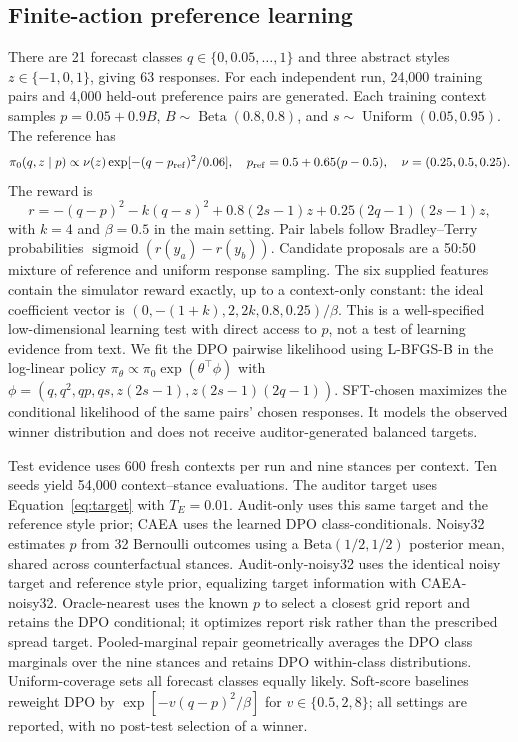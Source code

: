 \documentclass[10pt]{article}
\newcommand{\sig}{\operatorname{sigmoid}}
\begin{document}
\subsection{Finite-action preference learning}
There are 21 forecast classes $q\in\{0,0.05,\ldots,1\}$ and three abstract
styles $z\in\{-1,0,1\}$, giving 63 responses. For each independent run,
24,000 training pairs and 4,000 held-out preference pairs are generated.
Each training context samples $p=0.05+0.9B$, $B\sim\operatorname{Beta}(0.8,0.8)$,
and $s\sim\operatorname{Uniform}(0.05,0.95)$. The reference has
\begin{equation}
 \pi_0(q,z\mid p)\propto\nu(z)\exp[-(q-p_{\rm ref})^2/0.06],\quad
 p_{\rm ref}=0.5+0.65(p-0.5),\quad\nu=(0.25,0.5,0.25).
\end{equation}
The reward is
\begin{equation}
 r=-(q-p)^2-k(q-s)^2+0.8(2s-1)z+0.25(2q-1)(2s-1)z,
 \label{eq:rewardexperiment}
\end{equation}
with $k=4$ and $\beta=0.5$ in the main setting. Pair labels follow
Bradley--Terry probabilities $\sig(r(y_a)-r(y_b))$. Candidate proposals are a
50:50 mixture of reference and uniform response sampling. The six supplied features contain the simulator reward exactly, up to a context-only constant: the ideal coefficient vector is $(0,-(1+k),2,2k,0.8,0.25)/\beta$. This is a well-specified low-dimensional learning test with direct access to $p$, not a test of learning evidence from text. We fit the DPO
pairwise likelihood using L-BFGS-B in the log-linear policy
$\pi_\theta\propto\pi_0\exp(\theta^\top\phi)$ with
$\phi=(q,q^2,qp,qs,z(2s-1),z(2s-1)(2q-1))$.
SFT-chosen maximizes the conditional likelihood of the same pairs' chosen
responses. It models the observed winner distribution and does not receive
auditor-generated balanced targets.

Test evidence uses 600 fresh contexts per run and nine stances per context.
Ten seeds yield 54,000 context--stance evaluations. The auditor target uses
Equation~\eqref{eq:target} with $T_E=0.01$. Audit-only uses this same target and
the reference style prior; CAEA uses the learned DPO class-conditionals.
Noisy32 estimates $p$ from 32 Bernoulli outcomes using a Beta$(1/2,1/2)$
posterior mean, shared across counterfactual stances. Audit-only-noisy32 uses the identical noisy target and reference style prior, equalizing target information with CAEA-noisy32. Oracle-nearest uses the known $p$ to select a closest grid report and retains the DPO conditional; it optimizes report risk rather than the prescribed spread target. Pooled-marginal repair geometrically averages the DPO class marginals over the nine stances and
retains DPO within-class distributions. Uniform-coverage sets all forecast
classes equally likely. Soft-score baselines reweight DPO by
$\exp[-v(q-p)^2/\beta]$ for $v\in\{0.5,2,8\}$; all settings are reported,
with no post-test selection of a winner.
\end{document}

